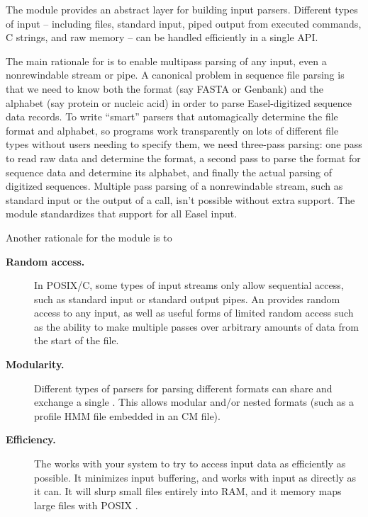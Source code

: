 
The  module provides an abstract layer for building
input parsers. Different types of input -- including files, standard
input, piped output from executed commands, C strings, and raw memory
-- can be handled efficiently in a single API.

The main rationale for  is to enable multipass parsing
of any input, even a nonrewindable stream or pipe. A canonical problem
in sequence file parsing is that we need to know both the format (say
FASTA or Genbank) and the alphabet (say protein or nucleic acid) in
order to parse Easel-digitized sequence data records. To write
``smart'' parsers that automagically determine the file format and
alphabet, so programs work transparently on lots of different file
types without users needing to specify them, we need three-pass
parsing: one pass to read raw data and determine the format, a second
pass to parse the format for sequence data and determine its alphabet,
and finally the actual parsing of digitized sequences. Multiple pass
parsing of a nonrewindable stream, such as standard input or the
output of a  call, isn't possible without extra
support. The  module standardizes that support for all Easel
input.

Another rationale for the  module is to 

\begin{description}
\item [ \textbf{Random access.} ] In POSIX/C, some types of input
  streams only allow sequential access, such as standard input or
  standard output pipes. An  provides random access
  to any input, as well as useful forms of limited random access such
  as the ability to make multiple passes over arbitrary amounts of
  data from the start of the file. 

\item [ \textbf{Modularity.} ] Different types of parsers for parsing
  different formats can share and exchange a single
  . This allows modular and/or nested formats (such
  as a \HMMER profile HMM file embedded in an \Infernal CM file).

\item [ \textbf{Efficiency.} ] The  works with your
  system to try to access input data as efficiently as possible. It
  minimizes input buffering, and works with input as directly as it
  can.  It will slurp small files entirely into RAM, and it memory
  maps large files with POSIX .
\end{description}




